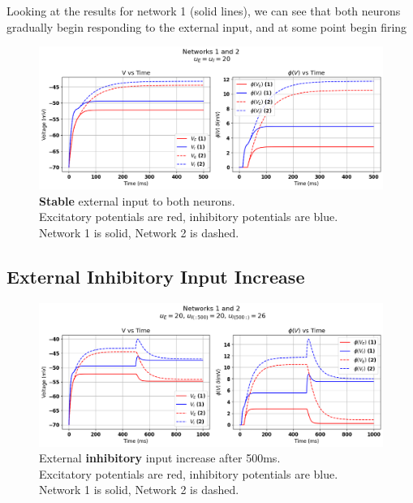 \documentclass[10pt,twocolumn]{article}
\begin{document}
Looking at the results for network 1 (solid lines), we can see that both neurons
gradually begin responding to the external input, and at some point begin firing

\begin{figure}
    \centering
    \captionsetup{justification=centering}
    \includegraphics[width=1\textwidth]{images/12-stable.png}
    \caption{\textbf{Stable} external input to both neurons.\\ Excitatory potentials are red, inhibitory potentials are blue. \\Network 1 is solid, Network 2 is dashed.}
    \label{fig:stable-input}
\end{figure}

\subsection{External Inhibitory Input Increase}


\begin{figure}
    \centering
    \captionsetup{justification=centering}
    \includegraphics[width=1\textwidth]{images/12-I_input.png}
    \caption{External \textbf{inhibitory} input increase after 500ms. \\Excitatory potentials are red, inhibitory potentials are blue.\\Network 1 is solid, Network 2 is dashed.}
    \label{fig:i-input}
\end{figure}
\end{document}
